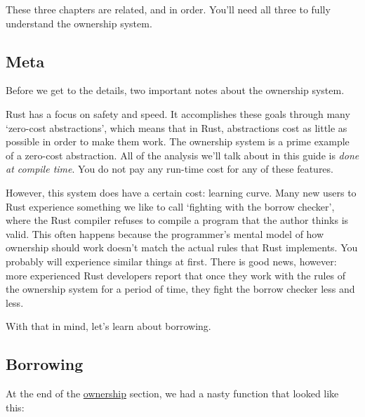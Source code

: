 \documentclass[a4paper,]{book}
\begin{document}
These three chapters are related, and in order. You'll need all three to
fully understand the ownership system.

\subsection{Meta}\label{meta-1}

Before we get to the details, two important notes about the ownership
system.

Rust has a focus on safety and speed. It accomplishes these goals
through many `zero-cost abstractions', which means that in Rust,
abstractions cost as little as possible in order to make them work. The
ownership system is a prime example of a zero-cost abstraction. All of
the analysis we'll talk about in this guide is \emph{done at compile
time}. You do not pay any run-time cost for any of these features.

However, this system does have a certain cost: learning curve. Many new
users to Rust experience something we like to call `fighting with the
borrow checker', where the Rust compiler refuses to compile a program
that the author thinks is valid. This often happens because the
programmer's mental model of how ownership should work doesn't match the
actual rules that Rust implements. You probably will experience similar
things at first. There is good news, however: more experienced Rust
developers report that once they work with the rules of the ownership
system for a period of time, they fight the borrow checker less and
less.

With that in mind, let's learn about borrowing.

\hypertarget{borrowing}{\subsection{Borrowing}\label{borrowing}}

At the end of the \protect\hyperlink{sec--ownership}{ownership} section,
we had a nasty function that looked like this:
\end{document}
